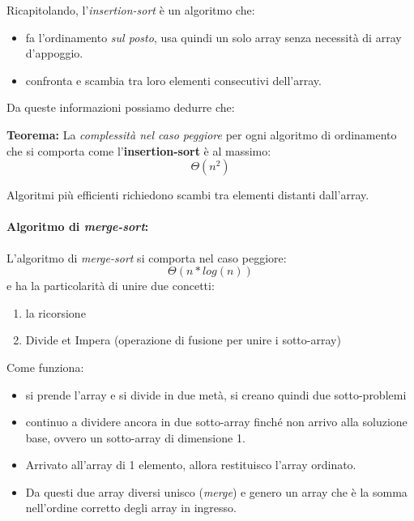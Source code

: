 \documentclass[
  paper=a4,
  oneside  ,captions=tableheading
]{scrbook}
\providecommand{\tightlist}{%
  \setlength{\itemsep}{0pt}\setlength{\parskip}{0pt}}
\begin{document}
Ricapitolando, l'\emph{insertion-sort} è un algoritmo che:

\begin{itemize}
\tightlist
\item
  fa l'ordinamento \emph{sul posto}, usa quindi un solo array senza
  necessità di array d'appoggio.
\item
  confronta e scambia tra loro elementi consecutivi dell'array.
\end{itemize}

Da queste informazioni possiamo dedurre che:

\textbf{Teorema:} La \emph{complessità nel caso peggiore} per ogni
algoritmo di ordinamento che si comporta come l'\textbf{insertion-sort}
è al massimo: \[
Θ(n^2)
\]

Algoritmi più efficienti richiedono scambi tra elementi distanti
dall'array.

\hypertarget{algoritmo-di-merge-sort}{%
\paragraph{\texorpdfstring{Algoritmo di
\emph{merge-sort}:}{Algoritmo di merge-sort:}}\label{algoritmo-di-merge-sort}}

L'algoritmo di \emph{merge-sort} si comporta nel caso peggiore: \[
Θ(n * log(n))
\] e ha la particolarità di unire due concetti:

\begin{enumerate}
\def\labelenumi{\arabic{enumi}.}
\tightlist
\item
  la ricorsione
\item
  Divide et Impera (operazione di fusione per unire i sotto-array)
\end{enumerate}

Come funziona:

\begin{itemize}
\tightlist
\item
  si prende l'array e si divide in due metà, si creano quindi due
  sotto-problemi
\item
  continuo a dividere ancora in due sotto-array finché non arrivo alla
  soluzione base, ovvero un sotto-array di dimensione 1.
\item
  Arrivato all'array di 1 elemento, allora restituisco l'array ordinato.
\item
  Da questi due array diversi unisco (\emph{merge}) e genero un array
  che è la somma nell'ordine corretto degli array in ingresso.
\end{itemize}
\end{document}
